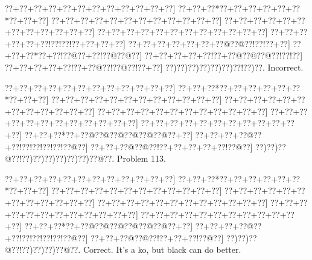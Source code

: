\documentclass[a5paper]{article}
\begin{document}
\begin{center}
{\goo
\0??+\0??+\0??+\0??+\0??+\0??+\0??+\0??+\0??+\0??+\0??+\0??]
\0??+\0??+\0??*\0??+\0??+\0??+\0??+\0??+\0??*\0??+\0??+\0??]
\0??+\0??+\0??+\0??+\0??+\0??+\0??+\0??+\0??+\0??+\0??+\0??]
\0??+\0??+\0??+\0??+\0??+\0??+\0??+\0??+\0??+\0??+\0??+\0??]
\0??+\0??+\0??+\0??+\0??+\0??+\0??+\0??+\0??+\0??+\0??+\0??]
\0??+\0??+\0??+\0??+\0??+\0??!\0??!\0??!\0??+\0??+\0??+\0??]
\0??+\0??+\0??+\0??+\0??+\0??+\0??@\0??@\0??!\0??!\0??+\0??]
\0??+\0??+\0??*\0??+\0??!\0??@\0??+\0??!\0??@\0??@\0??]
\0??+\0??+\0??+\0??+\0??!\0??+\0??@\0??@\0??@\0??!\0??!\0??]
\0??+\0??+\0??+\0??+\0??!\0??+\0??@\0??!\0??@\0??!\0??+\0??]
\0??)\0??)\0??)\0??)\0??)\0??)\0??!\0??)\0??.
}
Incorrect. 

\end{center}
\newpage
\begin{center}
{\goo
\0??+\0??+\0??+\0??+\0??+\0??+\0??+\0??+\0??+\0??+\0??+\0??]
\0??+\0??+\0??*\0??+\0??+\0??+\0??+\0??+\0??*\0??+\0??+\0??]
\0??+\0??+\0??+\0??+\0??+\0??+\0??+\0??+\0??+\0??+\0??+\0??]
\0??+\0??+\0??+\0??+\0??+\0??+\0??+\0??+\0??+\0??+\0??+\0??]
\0??+\0??+\0??+\0??+\0??+\0??+\0??+\0??+\0??+\0??+\0??+\0??]
\0??+\0??+\0??+\0??+\0??+\0??+\0??+\0??+\0??+\0??+\0??+\0??]
\0??+\0??+\0??+\0??+\0??+\0??+\0??+\0??+\0??+\0??+\0??+\0??]
\0??+\0??+\0??*\0??+\0??@\0??@\0??@\0??@\0??@\0??@\0??+\0??]
\0??+\0??+\0??+\0??@\0??+\0??!\0??!\0??!\0??!\0??!\0??@\0??]
\0??+\0??+\0??@\0??@\0??!\0??+\0??+\0??+\0??+\0??!\0??@\0??]
\0??)\0??)\0??@\0??!\0??)\0??)\0??)\0??)\0??)\0??)\0??@\0??.
}
Problem 113.

\end{center}
\begin{center}
{\goo
\0??+\0??+\0??+\0??+\0??+\0??+\0??+\0??+\0??+\0??+\0??+\0??]
\0??+\0??+\0??*\0??+\0??+\0??+\0??+\0??+\0??*\0??+\0??+\0??]
\0??+\0??+\0??+\0??+\0??+\0??+\0??+\0??+\0??+\0??+\0??+\0??]
\0??+\0??+\0??+\0??+\0??+\0??+\0??+\0??+\0??+\0??+\0??+\0??]
\0??+\0??+\0??+\0??+\0??+\0??+\0??+\0??+\0??+\0??+\0??+\0??]
\0??+\0??+\0??+\0??+\0??+\0??+\0??+\0??+\0??+\0??+\0??+\0??]
\0??+\0??+\0??+\0??+\0??+\0??+\0??+\0??+\0??+\0??+\0??+\0??]
\0??+\0??+\0??*\0??+\0??@\0??@\0??@\0??@\0??@\0??@\0??+\0??]
\0??+\0??+\0??+\0??@\0??+\0??!\0??!\0??!\0??!\0??!\0??@\0??]
\0??+\0??+\0??@\0??@\0??!\0??+\0??+\0??!\0??@\0??]
\0??)\0??)\0??@\0??!\0??)\0??)\0??)\0??@\0??.
}
Correct. It's a ko, but black can do better. 

\end{center}
\end{document}
